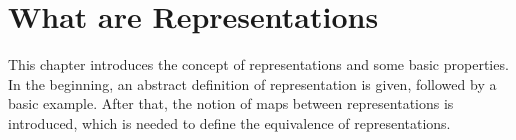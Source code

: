 \section{What are Representations}

This chapter introduces the concept of representations and some basic properties.
In the beginning, an abstract definition of representation is given, followed by a basic example.
After that, the notion of maps between representations is introduced, which is needed to define the equivalence of representations.
